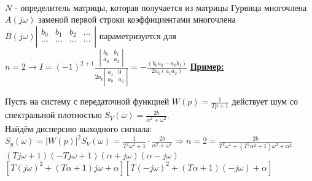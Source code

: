 \documentclass[preprint,russian,a5paper,10pt,twoside,mediummath]{ncc}
\newcommand{\ExampleMy}{\vspace{\baselineskip}\textbf{\underline{Пример:}}\nopagebreak\par}
\begin{document}
\\$N$ - определитель матрицы, которая получается из матрицы Гурвица многочлена $A\left( j\omega  \right)$ заменой первой строки коэффициентами многочлена $B\left( j\omega  \right)\left| \begin{matrix}
   {{b}_{0}} & {{b}_{1}} & {{b}_{2}} & ...  \\
   ... & ... & ... & ...  \\
\end{matrix} \right|$ параметризуется для $n=2\to I={{\left( -1 \right)}^{2+1}}\frac{\left| \begin{matrix}
   {{b}_{0}} & {{b}_{1}}  \\
   {{a}_{0}} & {{a}_{2}}  \\
\end{matrix} \right|}{2{{a}_{0}}\left| \begin{matrix}
   {{a}_{1}} & 0  \\
   {{a}_{0}} & {{a}_{2}}  \\
\end{matrix} \right|}=-\frac{\left( {{b}_{0}}{{a}_{2}}-{{a}_{0}}{{b}_{1}} \right)}{2{{a}_{0}}\left( {{a}_{1}}{{a}_{2}} \right)}$
\ExampleMy Пусть на систему с передаточной функцией $W\left( p \right)=\frac{1}{Tp+1}$ действует шум со спектральной плотностью ${{S}_{V}}\left( \omega  \right)=\frac{2b}{{{\alpha }^{2}}+{{\omega }^{2}}}$.
\\Найдём дисперсию выходного сигнала:  
\\${{S}_{y}}\left( \omega  \right)={{\left| W\left( p \right) \right|}^{2}}{{S}_{V}}\left( \omega  \right)=\frac{1}{{{T}^{2}}{{\omega }^{2}}+1}\cdot \frac{2b}{{{\alpha }^{2}}+{{\omega }^{2}}}\Rightarrow n=2=\frac{2b}{{{T}^{2}}{{\omega }^{4}}+\left( {{T}^{2}}{{\alpha }^{2}}+1 \right){{\omega }^{2}}+{{\alpha }^{2}}}$
\\$\left( Tj\omega +1 \right)\left( -Tj\omega +1 \right)\left( \alpha +j\omega  \right)\left( \alpha -j\omega  \right)$
\\$\left[ T{{\left( j\omega  \right)}^{2}}+\left( T\alpha +1 \right)j\omega +\alpha  \right]\left[ T{{\left( -j\omega  \right)}^{2}}+\left( T\alpha +1 \right)\left( -j\omega  \right)+\alpha  \right]$
\end{document}
